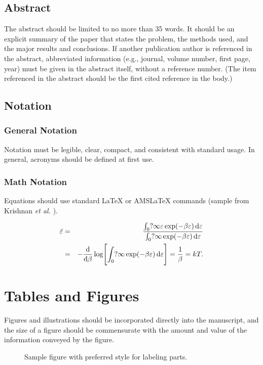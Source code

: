 \documentclass[letterpaper, 10pt]{article}
\begin{document}
\subsection{Abstract} The abstract
should be limited to no more than 35 words. It should be an
explicit summary of the paper that states the problem, the methods
used, and the major results and conclusions. If another publication author is referenced in the abstract, abbreviated information
(e.g., journal, volume number, first page, year) must be
given in the abstract itself, without a reference number. (The item referenced in the abstract should be the first
cited reference  in the body.)

\subsection{Notation}
\subsubsection{General Notation}
Notation must be
legible, clear, compact, and consistent with standard usage. In
general, acronyms should be defined at first use.


\subsubsection{Math Notation}
Equations should use standard \LaTeX{} or AMS\LaTeX{} commands (sample from Krishnan \textit{et al.} \cite{Chirwa18}).

\begin{eqnarray}
\bar\varepsilon &=& \frac{\int_0?\infty\varepsilon
\exp(-\beta\varepsilon)\,{\rm d}\varepsilon}{\int_0?\infty
\exp(-\beta\varepsilon)\,{\rm d}\varepsilon}\nonumber\\
&=& -\frac{{\rm d}}{{\rm d}\beta}\log\Biggl[\int_0?\infty\exp
(-\beta\varepsilon)\,{\rm d}\varepsilon\Biggr]=\frac1\beta=kT.
\end{eqnarray}

\section{Tables and Figures}
Figures and illustrations should be incorporated directly into the
manuscript, and the size of a figure should be commensurate with the amount
and value of the information conveyed by the figure.

\begin{figure}[htbp]
  \centering
\caption{Sample figure with preferred style for labeling parts.}
\end{figure}
\end{document}
